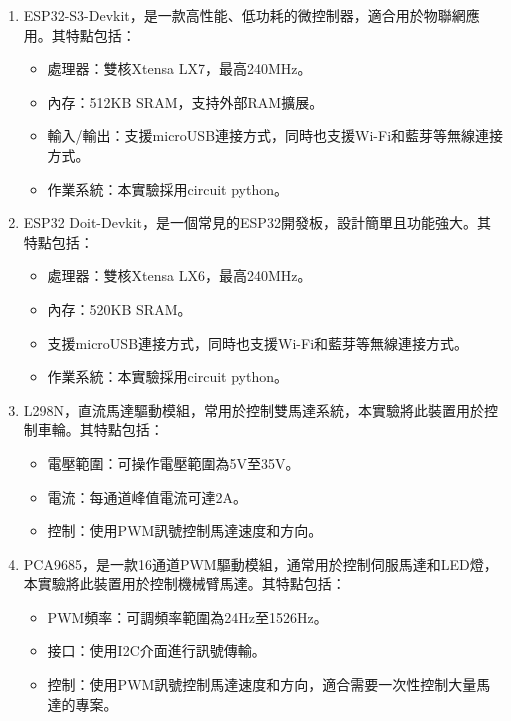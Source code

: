 \documentclass[class=NCU_thesis, crop=false]{standalone}
\begin{document}
\begin{enumerate}
\item ESP32-S3-Devkit，是一款高性能、低功耗的微控制器，適合用於物聯網應用。其特點包括：
\begin{itemize}
    \item 處理器：雙核Xtensa LX7，最高240MHz。
    \item 內存：512KB SRAM，支持外部RAM擴展。
    \item 輸入/輸出：支援microUSB連接方式，同時也支援Wi-Fi和藍芽等無線連接方式。
    \item 作業系統：本實驗採用circuit python。
\end{itemize}

\item ESP32 Doit-Devkit，是一個常見的ESP32開發板，設計簡單且功能強大。其特點包括：
\begin{itemize}
    \item 處理器：雙核Xtensa LX6，最高240MHz。
    \item 內存：520KB SRAM。
    \item 支援microUSB連接方式，同時也支援Wi-Fi和藍芽等無線連接方式。
    \item 作業系統：本實驗採用circuit python。
\end{itemize}

\item L298N，直流馬達驅動模組，常用於控制雙馬達系統，本實驗將此裝置用於控制車輪。其特點包括：
\begin{itemize}
    \item 電壓範圍：可操作電壓範圍為5V至35V。
    \item 電流：每通道峰值電流可達2A。
    \item 控制：使用PWM訊號控制馬達速度和方向。
\end{itemize}

\item PCA9685，是一款16通道PWM驅動模組，通常用於控制伺服馬達和LED燈，本實驗將此裝置用於控制機械臂馬達。其特點包括：
\begin{itemize}
    \item PWM頻率：可調頻率範圍為24Hz至1526Hz。
    \item 接口：使用I2C介面進行訊號傳輸。
    \item 控制：使用PWM訊號控制馬達速度和方向，適合需要一次性控制大量馬達的專案。
\end{itemize}
\end{enumerate}
\end{document}
